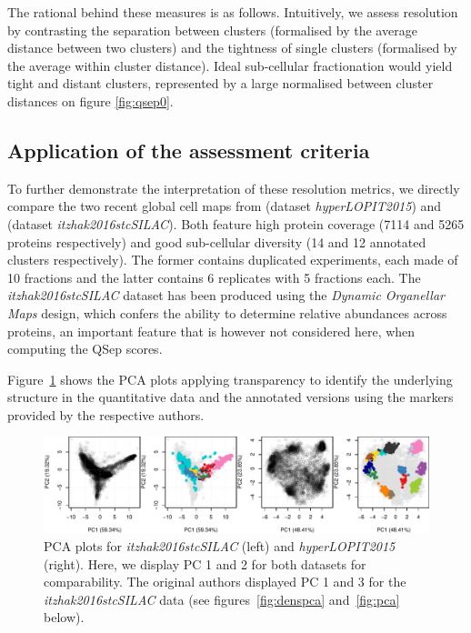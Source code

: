 \documentclass[12pt]{article}\usepackage[]{graphicx}\usepackage[]{color}
\makeatletter
\def\maxwidth{ %
  \ifdim\Gin@nat@width>\linewidth
    \linewidth
  \else
    \Gin@nat@width
  \fi
}
\newenvironment{knitrout}{}{} %
\makeatother
\begin{document}
The rational behind these measures is as follows. Intuitively, we
assess resolution by contrasting the separation between clusters
(formalised by the average distance between two clusters) and the
tightness of single clusters (formalised by the average within cluster
distance). Ideal sub-cellular fractionation would yield tight and
distant clusters, represented by a large normalised between cluster
distances on figure \ref{fig:qsep0}.

\clearpage

\subsection{Application of the assessment criteria}\label{sec:applic}



To further demonstrate the interpretation of these resolution metrics,
we directly compare the two recent global cell maps from
\cite{Christoforou:2016} (dataset \textit{hyperLOPIT2015}) and
\cite{Itzhak:2016} (dataset \textit{itzhak2016stcSILAC}). Both feature
high protein coverage (7114 and 5265 proteins
respectively) and good sub-cellular diversity (14 and
12 annotated clusters respectively). The former contains
duplicated experiments, each made of 10 fractions and the latter
contains 6 replicates with 5 fractions each. The
\textit{itzhak2016stcSILAC} dataset has been produced using the
\textit{Dynamic Organellar Maps} design, which confers the ability to
determine relative abundances across proteins, an important feature
that is however not considered here, when computing the QSep scores.

Figure~\ref{fig:pcacmp} shows the PCA plots applying transparency to
identify the underlying structure in the quantitative data and the
annotated versions using the markers provided by the respective
authors.

\begin{figure}[!h]
  \centering
\begin{knitrout}
\color{fgcolor}
\includegraphics[width=\maxwidth]{figure/pcacmp-1} 

\end{knitrout}
\caption{PCA plots for \textit{itzhak2016stcSILAC} (left) and
  \textit{hyperLOPIT2015} (right). Here, we display PC 1 and 2 for
  both datasets for comparability. The original authors displayed PC 1
  and 3 for the \textit{itzhak2016stcSILAC} data (see
  figures~\ref{fig:denspca} and~\ref{fig:pca} below).}
  \label{fig:pcacmp}
\end{figure}
\end{document}
